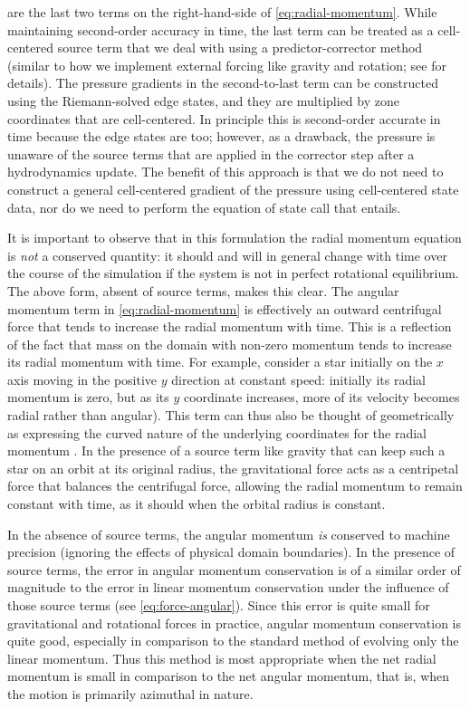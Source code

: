 \documentclass[twocolumn,numberedappendix]{../aastex60}
\begin{document}
are the last two terms on the right-hand-side of \autoref{eq:radial-momentum}.
While maintaining second-order accuracy in time, the last term can be treated as a
cell-centered source term that we deal with using a predictor-corrector
method (similar to how we implement external forcing like gravity and rotation; see
\cite{castro} for details). The pressure gradients in the second-to-last term can be
constructed using the Riemann-solved edge states, and they are multiplied by zone
coordinates that are cell-centered. In principle this is second-order accurate in time
because the edge states are too; however, as a drawback, the pressure is unaware of the
source terms that are applied in the corrector step after a hydrodynamics update. The
benefit of this approach is that we do not need to construct a general cell-centered
gradient of the pressure using cell-centered state data, nor do we need to perform the
equation of state call that entails.

It is important to observe that in this formulation the radial momentum equation
is \textit{not} a conserved quantity: it should and will in general change with
time over the course of the simulation if the system is not in perfect rotational
equilibrium. The above form, absent of source terms, makes this clear. The angular
momentum term in \autoref{eq:radial-momentum} is effectively an outward centrifugal
force that tends to increase the radial momentum with time. This is a reflection of
the fact that mass on the domain with non-zero momentum tends to increase its radial
momentum with time. For example, consider a star initially on the $x$ axis moving
in the positive $y$ direction at constant speed: initially its radial momentum is
zero, but as its $y$ coordinate increases, more of its velocity becomes radial rather
than angular).  This term can thus also be thought of geometrically as expressing the
curved nature of the underlying coordinates for the radial momentum
\citep{motl:2002}. In the presence of a source term like gravity that can keep
such a star on an orbit at its original radius, the gravitational force acts as a
centripetal force that balances the centrifugal force, allowing the radial momentum
to remain constant with time, as it should when the orbital radius is constant.

In the absence of source terms, the angular momentum \textit{is} conserved
to machine precision (ignoring the effects of physical domain boundaries). In the
presence of source terms, the error in angular momentum conservation is of a
similar order of magnitude to the error in linear momentum conservation under
the influence of those source terms (see \autoref{eq:force-angular}). Since this
error is quite small for gravitational and rotational forces in practice, angular
momentum conservation is quite good, especially in comparison to the standard
method of evolving only the linear momentum. Thus this method is most appropriate
when the net radial momentum is small in comparison to the net angular momentum,
that is, when the motion is primarily azimuthal in nature.
\end{document}

